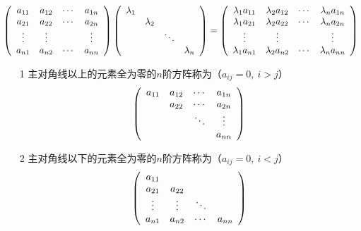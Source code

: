 \begin{frame}
\begin{zhu}
\begin{itemize}
    $$
    \left(
      \begin{array}{cccc}
        a_{11} & a_{12} & \cdots & a_{1n}\\
        a_{21} & a_{22} & \cdots & a_{2n}\\
        \vdots & \vdots &  & \vdots\\
        a_{n1} & a_{n2} & \cdots & a_{nn}
      \end{array}
    \right)  
    \left(
      \begin{array}{cccc}
        \lambda_1 & & &\\
                  & \lambda_2 & & \\
                  & & \ddots & \\
                  & & & \lambda_n
      \end{array}
    \right)
    = 
    \left(
      \begin{array}{cccc}
        \lambda_1a_{11} & \lambda_2a_{12} & \cdots & \lambda_na_{1n}\\
        \lambda_1a_{21} & \lambda_2a_{22} & \cdots & \lambda_na_{2n}\\
        \vdots & \vdots &  & \vdots\\
        \lambda_1a_{n1} & \lambda_2a_{n2} & \cdots & \lambda_na_{nn}
      \end{array}
    \right)
    $$
  \end{itemize}
\end{zhu}

\end{frame}

\begin{frame}
% 
\begin{dingyi}[三角矩阵]
  \begin{itemize}
  \item[1] 主对角线以上的元素全为零的$n$阶方阵称为（$a_{ij}=0, ~i>j$）
    $$
    \left(
      \begin{array}{cccc}
        a_{11} & a_{12} & \cdots & a_{1n} \\
               & a_{22} & \cdots & a_{2n} \\
               &       & \ddots & \vdots   \\
               &       &     & a_{nn}
      \end{array}
    \right)
    $$
  \item[2] 主对角线以下的元素全为零的$n$阶方阵称为（$a_{ij}=0, ~i<j$）
    $$
    \left(
      \begin{array}{cccc}
        a_{11} &       &     &       \\
        a_{21} & a_{22} &     &  \\
        \vdots   & \vdots   & \ddots &    \\
        a_{n1} & a_{n2} & \cdots & a_{nn}
      \end{array}
    \right)
    $$
  \end{itemize}
\end{dingyi}
\end{frame}

